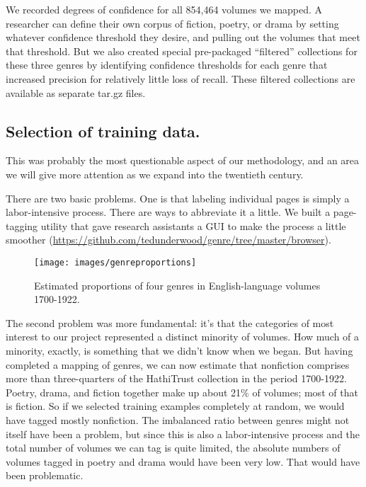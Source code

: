 \documentclass[paper=a4, fontsize=12pt]{scrartcl}
\numberwithin{equation}{section}		%
\numberwithin{figure}{section}			%
\numberwithin{table}{section}				%
\begin{document}
We recorded degrees of confidence for all 854,464 volumes we mapped. A researcher can define their own corpus of fiction, poetry, or drama by setting whatever confidence threshold they desire, and pulling out the volumes that meet that threshold. But we also created special pre-packaged ``filtered'' collections for these three genres by identifying confidence thresholds for each genre that increased precision for relatively little loss of recall. These filtered collections are available as separate tar.gz files.

\subsection{Selection of training data.}

This was probably the most questionable aspect of our methodology, and an area we will give more attention as we expand into the twentieth century.

There are two basic problems. One is that labeling individual pages is simply a labor-intensive process. There are ways to abbreviate it a little. We built a page-tagging utility that gave research assistants a GUI to make the process a little smoother (\url{https://github.com/tedunderwood/genre/tree/master/browser}).

\begin{figure}[!h]
\centering
\texttt{[image: images/genreproportions]}
\caption{Estimated proportions of four genres in English-language volumes 1700-1922.}
\label{genreproportions}
\end{figure}

The second problem was more fundamental: it's that the categories of most interest to our project represented a distinct minority of volumes. How much of a minority, exactly, is something that we didn't know when we began. But having completed a mapping of genres, we can now estimate that nonfiction comprises more than three-quarters of the HathiTrust collection in the period 1700-1922. Poetry, drama, and fiction together make up about 21\% of volumes; most of that is fiction. So if we selected training examples completely at random, we would have tagged mostly nonfiction. The imbalanced ratio between genres might not itself have been a problem, but since this is also a labor-intensive process and the total number of volumes we can tag is quite limited, the absolute numbers of volumes tagged in poetry and drama would have been very low. That would have been problematic.
\end{document}
